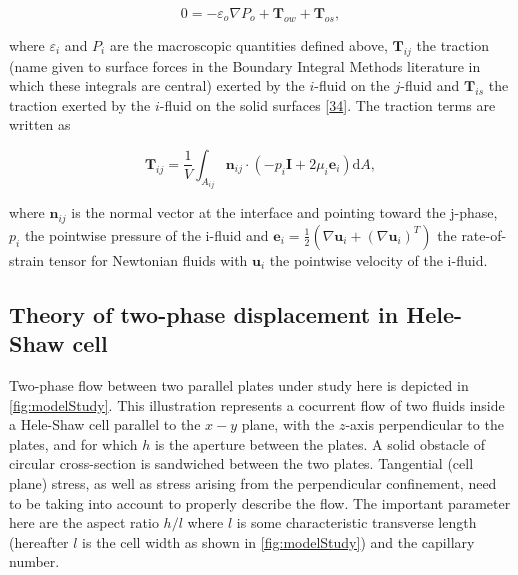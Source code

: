 \documentclass[]{article}
\begin{document}
\[
0=-\varepsilon_{o}\nabla P_{o}+\mathbf{T}_{ow}+\mathbf{T}_{os},
\]

where \(\varepsilon_{i}\) and \(P_{i}\) are the macroscopic quantities
defined above, \(\mathbf{T}_{ij}\) the traction (name given to surface
forces in the Boundary Integral Methods literature in which these
integrals are central) exerted by the \(i\)-fluid on the \(j\)-fluid and
\(\mathbf{T}_{is}\) the traction exerted by the \(i\)-fluid on the solid
surfaces {[}\protect\hyperlink{ref-Kalaydjian1987}{34}{]}. The traction
terms are written as

\[
\mathbf{T}_{ij}=\frac{1}{V}\int_{A_{ij}}\mathbf{n}_{ij}\cdot\left(-p_{i}\mathbf{I}+2\mu_{i}\mathbf{e}_{i}\right)\mathrm{d}A,
\]

where \(\mathbf{n}_{ij}\) is the normal vector at the interface and
pointing toward the j-phase, \(p_{i}\) the pointwise pressure of the
i-fluid and
\(\mathbf{e}_{i}=\frac{1}{2}\left(\nabla\mathbf{u}_{i}+\left(\nabla\mathbf{u}_{i}\right)^{T}\right)\)
the rate-of-strain tensor for Newtonian fluids with \(\mathbf{u}_{i}\)
the pointwise velocity of the i-fluid.

\hypertarget{theory-of-two-phase-displacement-in-hele-shaw-cell}{%
\subsection{Theory of two-phase displacement in Hele-Shaw
cell}\label{theory-of-two-phase-displacement-in-hele-shaw-cell}}

Two-phase flow between two parallel plates under study here is depicted
in \cref{fig:modelStudy}. This illustration represents a cocurrent flow
of two fluids inside a Hele-Shaw cell parallel to the \(x-y\) plane,
with the \(z\)-axis perpendicular to the plates, and for which \(h\) is
the aperture between the plates. A solid obstacle of circular
cross-section is sandwiched between the two plates. Tangential (cell
plane) stress, as well as stress arising from the perpendicular
confinement, need to be taking into account to properly describe the
flow. The important parameter here are the aspect ratio \(h/l\) where
\(l\) is some characteristic transverse length (hereafter \(l\) is the
cell width as shown in \cref{fig:modelStudy}) and the capillary number.
\end{document}

